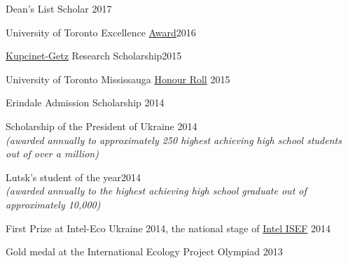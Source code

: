 \documentclass[margin,line]{res}
\begin{document}
\begin{resume}
\vspace*{-2.5mm}

Dean’s List Scholar \hfill{2017}

\vspace*{-2.5mm}

University of Toronto Excellence \href{https://registrar.utoronto.ca/finances-and-funding/utea/}{Award}\hfill{2016}


\vspace*{-2.5mm}

\href{https://www.weizmann.ac.il/feinberg/admissions/kupcinet-getz-international-summer-school/about-program-0}{Kupcinet-Getz} Research Scholarship\hfill{2015}

\vspace*{-2.5mm}


University of Toronto Mississauga \href{https://www.utm.utoronto.ca/cps/honour-roll/2014-15}{Honour Roll} \hfill{2015}

\vspace*{-2.5mm}

Erindale Admission Scholarship  \hfill{2014} 

\vspace*{-2.5mm}

Scholarship of the President of Ukraine \hfill{2014}\\
{\em(awarded annually to approximately 250 highest achieving high school students out of over a million)}

\vspace*{-2.5mm}

Lutsk's student of the year\hfill{2014}\\
{\em(awarded annually to the highest achieving high school graduate out of approximately 10,000)}
\vspace*{-2.5mm}

First Prize at Intel-Eco Ukraine 2014, the national stage of \href{https://student.societyforscience.org/intel-isef}{Intel ISEF} \hfill{2014}

\vspace*{-2.5mm}

Gold medal at the International Ecology Project Olympiad \hfill{2013}



\end{resume}

\newpage

\pagestyle{headings}
\end{document}
